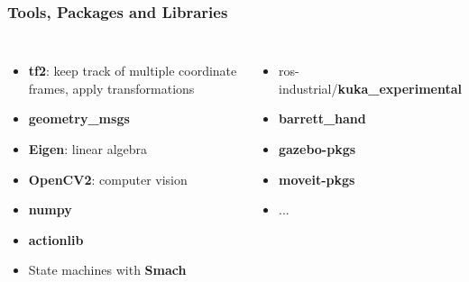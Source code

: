 \begin{frame}
\frametitle{Tools, Packages and Libraries}
\begin{columns}[t]
\begin{itemize}
\item \textbf{tf2}: keep track of multiple coordinate frames, apply transformations
\item \textbf{geometry\_msgs}
\item \textbf{Eigen}: linear algebra
\item \textbf{OpenCV2}: computer vision
\item \textbf{numpy}
\item \textbf{actionlib}
\item State machines with \textbf{Smach}
\end{itemize}

\begin{itemize}
\item  ros-industrial/\textbf{kuka\_experimental }
\item \textbf{barrett\_hand}
\item \textbf{gazebo-pkgs}
\item \textbf{moveit-pkgs}
\item ...
\end{itemize}
\end{columns}
\end{frame}